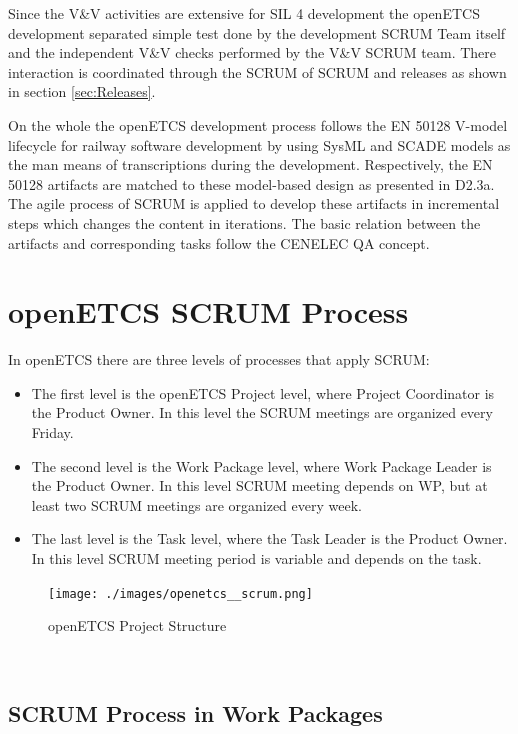 Since the V\&V activities are extensive for SIL 4 development the openETCS development separated simple test done by the development SCRUM Team itself and the independent V\&V checks performed by the V\&V SCRUM team. There interaction is coordinated through the SCRUM of SCRUM and releases as shown in section \ref{sec:Releases}.

On the whole the openETCS development process follows the EN 50128 V-model lifecycle for railway software development by using SysML and SCADE models as the man means of transcriptions during the development. Respectively, the EN 50128 artifacts are matched to these model-based design as presented in D2.3a. The agile process of SCRUM is applied to  develop these artifacts in incremental steps which changes the content in iterations. The basic relation between the artifacts and corresponding tasks follow the CENELEC QA concept.


\chapter{openETCS SCRUM Process}
\label{sec:ScrumProzess}

In openETCS there are three levels of processes that apply SCRUM:
\begin{itemize}
	\item The first level is the openETCS Project level, where Project Coordinator is the Product Owner. In this level the SCRUM meetings are organized every Friday.
	\item The second level is the Work Package level, where Work Package Leader is the Product Owner. In this level SCRUM meeting depends on WP, but at least two SCRUM meetings are organized every week.
	\item The last level is the Task level, where the Task Leader is the Product Owner. In this level SCRUM meeting period is variable and depends on the task.
\end{itemize}

\begin{figure}[h]
	\centering
	\texttt{[image: ./images/openetcs\_\_scrum.png]}
	\caption{openETCS Project Structure}
\end{figure}

 \\

\section{SCRUM Process in Work Packages}

